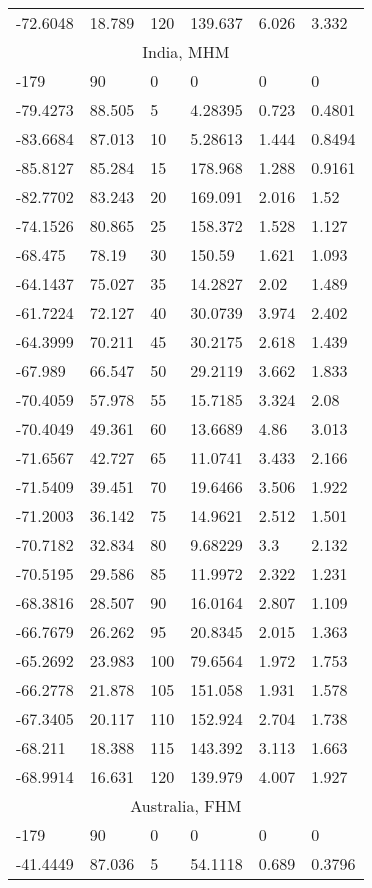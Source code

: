 \begin{longtable}[c]{@{}llllll@{}}
-72.6048 & 18.789 & 120 & 139.637 & 6.026 & 3.332 \\
\multicolumn{6}{c}{India, MHM} \\
-179 & 90 & 0 & 0 & 0 & 0 \\
-79.4273 & 88.505 & 5 & 4.28395 & 0.723 & 0.4801 \\
-83.6684 & 87.013 & 10 & 5.28613 & 1.444 & 0.8494 \\
-85.8127 & 85.284 & 15 & 178.968 & 1.288 & 0.9161 \\
-82.7702 & 83.243 & 20 & 169.091 & 2.016 & 1.52 \\
-74.1526 & 80.865 & 25 & 158.372 & 1.528 & 1.127 \\
-68.475 & 78.19 & 30 & 150.59 & 1.621 & 1.093 \\
-64.1437 & 75.027 & 35 & 14.2827 & 2.02 & 1.489 \\
-61.7224 & 72.127 & 40 & 30.0739 & 3.974 & 2.402 \\
-64.3999 & 70.211 & 45 & 30.2175 & 2.618 & 1.439 \\
-67.989 & 66.547 & 50 & 29.2119 & 3.662 & 1.833 \\
-70.4059 & 57.978 & 55 & 15.7185 & 3.324 & 2.08 \\
-70.4049 & 49.361 & 60 & 13.6689 & 4.86 & 3.013 \\
-71.6567 & 42.727 & 65 & 11.0741 & 3.433 & 2.166 \\
-71.5409 & 39.451 & 70 & 19.6466 & 3.506 & 1.922 \\
-71.2003 & 36.142 & 75 & 14.9621 & 2.512 & 1.501 \\
-70.7182 & 32.834 & 80 & 9.68229 & 3.3 & 2.132 \\
-70.5195 & 29.586 & 85 & 11.9972 & 2.322 & 1.231 \\
-68.3816 & 28.507 & 90 & 16.0164 & 2.807 & 1.109 \\
-66.7679 & 26.262 & 95 & 20.8345 & 2.015 & 1.363 \\
-65.2692 & 23.983 & 100 & 79.6564 & 1.972 & 1.753 \\
-66.2778 & 21.878 & 105 & 151.058 & 1.931 & 1.578 \\
-67.3405 & 20.117 & 110 & 152.924 & 2.704 & 1.738 \\
-68.211 & 18.388 & 115 & 143.392 & 3.113 & 1.663 \\
-68.9914 & 16.631 & 120 & 139.979 & 4.007 & 1.927 \\
\multicolumn{6}{c}{Australia, FHM} \\
-179 & 90 & 0 & 0 & 0 & 0 \\
-41.4449 & 87.036 & 5 & 54.1118 & 0.689 & 0.3796 \\

\end{longtable}
